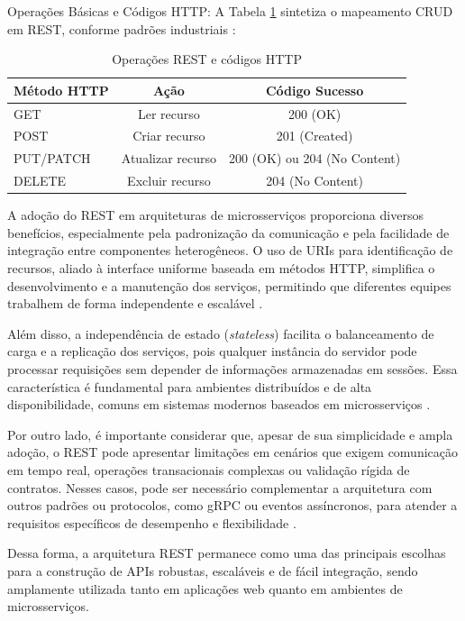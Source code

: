 Operações Básicas e Códigos HTTP:
A Tabela \ref{tab:rest_operations} sintetiza o mapeamento CRUD em REST, conforme padrões industriais \cite{fielding2000rest}:

\begin{table}[h]
\centering
\caption{Operações REST e códigos HTTP}
\label{tab:rest_operations}
\begin{tabular}{|l|c|c|}
\hline
Método HTTP & Ação & Código Sucesso \\ \hline
GET & Ler recurso & 200 (OK) \\ \hline
POST & Criar recurso & 201 (Created) \\ \hline
PUT/PATCH & Atualizar recurso & 200 (OK) ou 204 (No Content) \\ \hline
DELETE & Excluir recurso & 204 (No Content) \\ \hline
\end{tabular}
\end{table}

A adoção do REST em arquiteturas de microsserviços proporciona diversos benefícios, especialmente pela padronização da comunicação e pela facilidade de integração entre componentes heterogêneos. O uso de URIs para identificação de recursos, aliado à interface uniforme baseada em métodos HTTP, simplifica o desenvolvimento e a manutenção dos serviços, permitindo que diferentes equipes trabalhem de forma independente e escalável \cite{fielding2000rest, maso2024comparativo}.

Além disso, a independência de estado (\textit{stateless}) facilita o balanceamento de carga e a replicação dos serviços, pois qualquer instância do servidor pode processar requisições sem depender de informações armazenadas em sessões. Essa característica é fundamental para ambientes distribuídos e de alta disponibilidade, comuns em sistemas modernos baseados em microsserviços \cite{fielding2000rest, maso2024comparativo}.

Por outro lado, é importante considerar que, apesar de sua simplicidade e ampla adoção, o REST pode apresentar limitações em cenários que exigem comunicação em tempo real, operações transacionais complexas ou validação rígida de contratos. Nesses casos, pode ser necessário complementar a arquitetura com outros padrões ou protocolos, como gRPC ou eventos assíncronos, para atender a requisitos específicos de desempenho e flexibilidade \cite{niswar2023performance}.

Dessa forma, a arquitetura REST permanece como uma das principais escolhas para a construção de APIs robustas, escaláveis e de fácil integração, sendo amplamente utilizada tanto em aplicações web quanto em ambientes de microsserviços.

